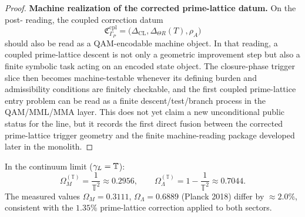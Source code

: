 \begin{proof}
\medskip
\noindent\textbf{Machine realization of the corrected prime-lattice datum.}
On the post- reading, the coupled correction datum
\[
 \mathfrak{C}_{\Gamma_P}^{\mathrm{cpl}}
 =
 \bigl(
 \Delta_{\mathrm{CL}},
 \Delta_{\Theta R}(T),
 \rho_A
 \bigr)
\]
should also be read as a QAM-encodable machine object. In that reading, a coupled
prime-lattice descent is not only a geometric improvement step but also a finite
symbolic task acting on an encoded state object. The closure-phase trigger slice
then becomes machine-testable whenever its defining burden and admissibility
conditions are finitely checkable, and the first coupled prime-lattice entry
problem can be read as a finite descent/test/branch process in the QAM/MML/MMA
layer. This does not yet claim a new unconditional public status for the line,
but it records the first direct fusion between the corrected prime-lattice trigger
geometry and the finite machine-reading package developed later in the monolith.
\end{proof}


\begin{corollary}
\label{cor:tribonacci-cosmo}
In the continuum limit ($\gamma_L = \mathbb{T}$):
\[
 \Omega_M^{(\mathbb{T})} = \frac{1}{\mathbb{T}^2} \approx 0.2956,
 \qquad
 \Omega_\Lambda^{(\mathbb{T})} = 1-\frac{1}{\mathbb{T}^2} \approx 0.7044.
\]
The measured values $\Omega_M = 0.3111$, $\Omega_\Lambda = 0.6889$
(Planck 2018) differ by $\approx 2.0\%$, consistent with the
$1.35\%$ prime-lattice correction applied to both sectors.
\end{corollary}


